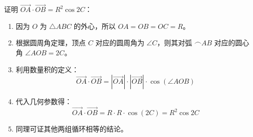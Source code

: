 \begin{proofbox}
证明 $\vec{OA} \cdot \vec{OB} = R^2 \cos 2C$：
\begin{enumerate}
    \item 因为 $O$ 为 $\triangle ABC$ 的外心，所以 $OA=OB=OC=R$。
    \item 根据圆周角定理，顶点 $C$ 对应的圆周角为 $\angle C$，则其对弧 $\frown{AB}$ 对应的圆心角 $\angle AOB = 2C$。
    \item 利用数量积的定义：
    \[ \vec{OA} \cdot \vec{OB} = |\vec{OA}| \cdot |\vec{OB}| \cdot \cos(\angle AOB) \]
    \item 代入几何参数得：
    \[ \vec{OA} \cdot \vec{OB} = R \cdot R \cdot \cos(2C) = R^2 \cos 2C \]
    \item 同理可证其他两组循环相等的结论。
\end{enumerate}
\end{proofbox}